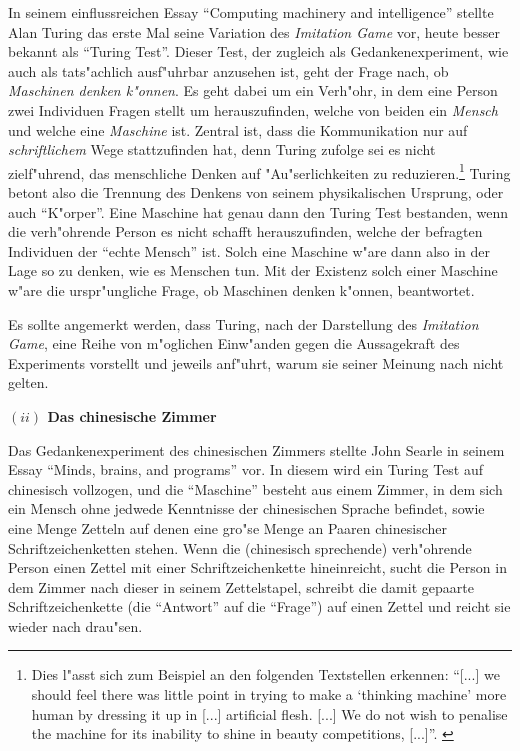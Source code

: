 \documentclass[a4paper, emulatestandardclasses, 12pt]{scrartcl}
\begin{document}
\begin{onehalfspace}
\noindent In seinem einflussreichen Essay "`Computing machinery and intelligence"' \citep{turing1950computing} stellte Alan Turing das erste Mal seine Variation des \emph{Imitation Game} vor, heute besser bekannt als "`Turing Test"'. Dieser Test, der zugleich als Gedankenexperiment, wie auch als tats"achlich ausf"uhrbar anzusehen ist, geht der Frage nach, ob \emph{Maschinen denken k"onnen}. Es geht dabei um ein Verh"ohr, in dem eine Person zwei Individuen Fragen stellt um herauszufinden, welche von beiden ein \emph{Mensch} und welche eine \emph{Maschine} ist. Zentral ist, dass die Kommunikation nur auf \emph{schriftlichem} Wege stattzufinden hat, denn Turing zufolge sei es nicht zielf"uhrend, das menschliche Denken auf "Au"serlichkeiten zu reduzieren.\footnote{Dies l"asst sich zum Beispiel an den folgenden Textstellen erkennen: "`[...] we should feel there was little point in trying to make a `thinking machine' more human by dressing it up in [...] artificial flesh. [...] We do not wish to penalise the machine for its inability to shine in beauty competitions, [...]"'. \citep[S. 434]{turing1950computing}} Turing betont also die Trennung des Denkens von seinem physikalischen Ursprung, oder auch "`K"orper"'. Eine Maschine hat genau dann den Turing Test bestanden, wenn die verh"ohrende Person es nicht schafft herauszufinden, welche der befragten Individuen der "`echte Mensch"' ist. Solch eine Maschine w"are dann also in der Lage so zu denken, wie es Menschen tun. Mit der Existenz solch einer Maschine w"are die urspr"ungliche Frage, ob Maschinen denken k"onnen, beantwortet.

Es sollte angemerkt werden, dass Turing, nach der Darstellung des \emph{Imitation Game}, eine Reihe von m"oglichen Einw"anden gegen die Aussagekraft des Experiments vorstellt und jeweils anf"uhrt, warum sie seiner Meinung nach nicht gelten. %

\newpage
\noindent\textbf{$(ii)$ Das chinesische Zimmer}

\noindent Das Gedankenexperiment des chinesischen Zimmers stellte John Searle in seinem Essay "`Minds, brains, and programs"' vor. In diesem wird ein Turing Test auf chinesisch vollzogen, und die "`Maschine"' besteht aus einem Zimmer, in dem sich ein Mensch ohne jedwede Kenntnisse der chinesischen Sprache befindet, sowie eine Menge Zetteln auf denen eine gro"se Menge an Paaren chinesischer Schriftzeichenketten stehen. Wenn die (chinesisch sprechende) verh"ohrende Person einen Zettel mit einer Schriftzeichenkette hineinreicht, sucht die Person in dem Zimmer nach dieser in seinem Zettelstapel, schreibt die damit gepaarte Schriftzeichenkette (die "`Antwort"' auf die "`Frage"') auf einen Zettel und reicht sie wieder nach drau"sen. 


\end{onehalfspace}
\end{document}
